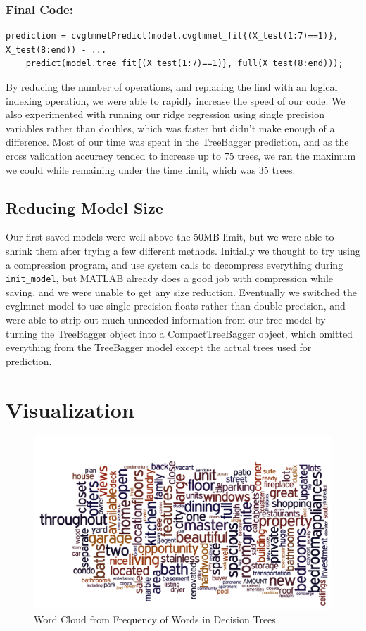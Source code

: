\documentclass[11pt]{article}
\begin{document}
\subsubsection*{Final Code:}
\begin{lstlisting}
prediction = cvglmnetPredict(model.cvglmnet_fit{(X_test(1:7)==1)}, X_test(8:end)) - ...
	predict(model.tree_fit{(X_test(1:7)==1)}, full(X_test(8:end)));
\end{lstlisting}

By reducing the number of operations, and replacing the find with an logical indexing operation, we were able to rapidly increase the speed of our code. We also experimented with running our ridge regression using single precision variables rather than doubles, which was faster but didn't make enough of a difference. Most of our time was spent in the TreeBagger prediction, and as the cross validation accuracy tended to increase up to 75 trees, we ran the maximum we could while remaining under the time limit, which was 35 trees.

\subsection{Reducing Model Size}
Our first saved models were well above the 50MB limit, but we were able to shrink them after trying a few different methods. Initially we thought to try using a compression program, and use system calls to decompress everything during \texttt{init\_model}, but MATLAB already does a good job with compression while saving, and we were unable to get any size reduction. Eventually we switched the cvglmnet model to use single-precision floats rather than double-precision, and were able to strip out much unneeded information from our tree model by turning the TreeBagger object into a CompactTreeBagger object, which omitted everything from the TreeBagger model except the actual trees used for prediction. 

\section{Visualization}

\begin{figure}
	\centering
	\caption{Word Cloud from Frequency of Words in Decision Trees}
	\includegraphics[scale=0.55]{word_cloud.png}
\end{figure}
\end{document}

